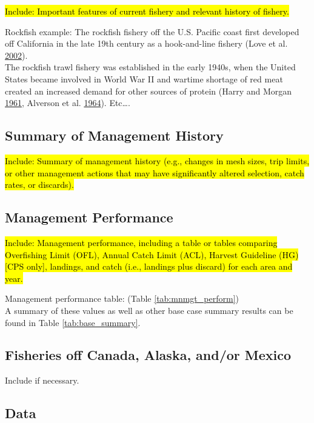 \documentclass[12pt,]{article}
\begin{document}
\hl{Include: Important features of current fishery and relevant history of fishery.}

Rockfish example: The rockfish fishery off the U.S. Pacific coast first
developed off California in the late 19th century as a hook-and-line
fishery (Love et al. \protect\hyperlink{ref-Love2002}{2002}).\\
The rockfish trawl fishery was established in the early 1940s, when the
United States became involved in World War II and wartime shortage of
red meat created an increased demand for other sources of protein (Harry
and Morgan \protect\hyperlink{ref-Harry1961}{1961}, Alverson et al.
\protect\hyperlink{ref-Alverson1964}{1964}). Etc\ldots{}.

\subsection{Summary of Management
History}\label{summary-of-management-history}

\hl{Include: Summary of management history (e.g., changes in mesh sizes, trip 
limits, or other management actions that may have significantly altered selection, 
catch rates, or discards).}

\subsection{Management Performance}\label{management-performance-1}

\hl{Include: Management performance, including a table or tables comparing 
Overfishing Limit (OFL), Annual Catch Limit (ACL), Harvest Guideline (HG) 
[CPS only], landings, and catch (i.e., landings plus discard) for each area and year.}

Management performance table: (Table \ref{tab:mnmgt_perform})\\
A summary of these values as well as other base case summary results can
be found in Table \ref{tab:base_summary}.

\subsection{Fisheries off Canada, Alaska, and/or
Mexico}\label{fisheries-off-canada-alaska-andor-mexico}

Include if necessary.

\subsection{Data}\label{data}
\end{document}
